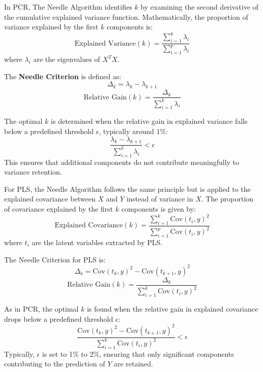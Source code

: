\documentclass[11pt,twoside,a4paper]{article}
\begin{document}
In PCR, The Needle Algorithm identifies \( k \) by examining the second derivative of the cumulative explained variance function. Mathematically, the proportion of variance explained by the first \( k \) components is:
\begin{equation}
\text{Explained Variance}(k) = \frac{\sum_{i=1}^{k} \lambda_i}{\sum_{i=1}^{p} \lambda_i}
\end{equation}
where \( \lambda_i \) are the eigenvalues of \( X^T X \). 

The \textbf{Needle Criterion} is defined as:
\begin{equation}
\Delta_k = \lambda_k - \lambda_{k+1}
\end{equation}
\begin{equation}
\text{Relative Gain}(k) = \frac{\Delta_k}{\sum_{i=1}^{k} \lambda_i}
\end{equation}

The optimal \( k \) is determined when the relative gain in explained variance falls below a predefined threshold \( \epsilon \), typically around \( 1\% \):
\begin{equation}
\frac{\lambda_k - \lambda_{k+1}}{\sum_{i=1}^{k} \lambda_i} < \epsilon
\end{equation}
This ensures that additional components do not contribute meaningfully to variance retention.

For PLS, the Needle Algorithm follows the same principle but is applied to the explained covariance between \( X \) and \( Y \) instead of variance in \( X \). The proportion of covariance explained by the first \( k \) components is given by:
\begin{equation}
\text{Explained Covariance}(k) = \frac{\sum_{i=1}^{k} \text{Cov}(t_i, y)^2}{\sum_{i=1}^{p} \text{Cov}(t_i, y)^2}
\end{equation}
where \( t_i \) are the latent variables extracted by PLS.

The Needle Criterion for PLS is:
\begin{equation}
\Delta_k = \text{Cov}(t_k, y)^2 - \text{Cov}(t_{k+1}, y)^2
\end{equation}
\begin{equation}
\text{Relative Gain}(k) = \frac{\Delta_k}{\sum_{i=1}^{k} \text{Cov}(t_i, y)^2}
\end{equation}

As in PCR, the optimal \( k \) is found when the relative gain in explained covariance drops below a predefined threshold \( \epsilon \):
\begin{equation}
\frac{\text{Cov}(t_k, y)^2 - \text{Cov}(t_{k+1}, y)^2}{\sum_{i=1}^{k} \text{Cov}(t_i, y)^2} < \epsilon
\end{equation}
Typically, \( \epsilon \) is set to 1\% to 2\%, ensuring that only significant components contributing to the prediction of \( Y \) are retained.
\end{document}
